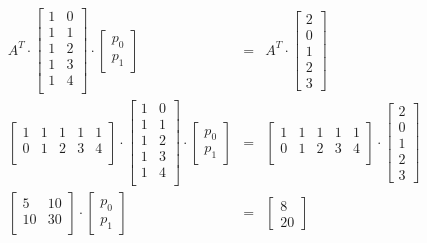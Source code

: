 \documentclass{report}
\begin{document}
				\begin{eqnarray*}
					A^T \cdot \begin{bmatrix}
						1 & 0 \\ 1 & 1 \\ 1 & 2 \\ 1 & 3 \\ 1 & 4 \\
					\end{bmatrix} \cdot \begin{bmatrix}
						p_0 \\ p_1
					\end{bmatrix} &=& A^T \cdot \begin{bmatrix} 2 \\ 0 \\ 1 \\ 2 \\ 3 \end{bmatrix} \\
					\begin{bmatrix}
						1 & 1 & 1 & 1 & 1 \\
						0 & 1 & 2 & 3 & 4 \\
					\end{bmatrix}\cdot \begin{bmatrix}
						1 & 0 \\ 1 & 1 \\ 1 & 2 \\ 1 & 3 \\ 1 & 4 \\
					\end{bmatrix} \cdot \begin{bmatrix}
						p_0 \\ p_1
					\end{bmatrix} &=& \begin{bmatrix}
					1 & 1 & 1 & 1 & 1 \\
					0 & 1 & 2 & 3 & 4 \\
					\end{bmatrix} \cdot \begin{bmatrix} 2 \\ 0 \\ 1 \\ 2 \\ 3 \end{bmatrix} \\
					\begin{bmatrix}
						5 & 10 \\ 10 & 30 \\
					\end{bmatrix} \cdot \begin{bmatrix}
					p_0 \\ p_1
					\end{bmatrix} &=& \begin{bmatrix} 8 \\ 20 \end{bmatrix}
				\end{eqnarray*}
\end{document}
